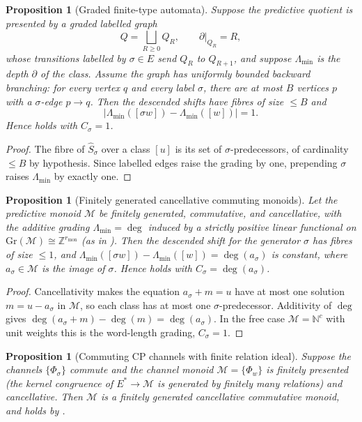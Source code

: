 \documentclass[11pt]{article}
\newtheorem{proposition}[theorem]{Proposition}
\theoremstyle{definition}
\theoremstyle{remark}
\newcommand{\N}{\mathbb{N}}
\newcommand{\Z}{\mathbb{Z}}
\newcommand{\M}{\mathcal{M}}
\newcommand{\rmon}{r_{\mathrm{mon}}}
\newcommand{\Lam}{\Lambda}
\begin{document}
\begin{proposition}[Graded finite-type automata]
\label{prop:fibres-automata}
Suppose the predictive quotient is presented by a graded labelled graph
\[
  Q=\bigsqcup_{R\ge0}Q_R,\qquad \partial|_{Q_R}=R,
\]
whose transitions labelled by $\sigma\in E$ send $Q_R$ to $Q_{R+1}$, and
suppose $\Lam_{\min}$ is the depth $\partial$ of the class.  Assume the graph has
uniformly bounded backward branching: for every vertex $q$ and every label
$\sigma$, there are at most $B$ vertices $p$ with a $\sigma$-edge $p\to q$.
Then the descended shifts have fibres of size $\le B$ and
\[
  |\Lam_{\min}([\sigma w])-\Lam_{\min}([w])|=1 .
\]
Hence  holds with $C_\sigma=1$.
\end{proposition}

\begin{proof}
The fibre of $\widehat S_\sigma$ over a class $[u]$ is its set of
$\sigma$-predecessors, of cardinality $\le B$ by hypothesis.  Since labelled
edges raise the grading by one, prepending $\sigma$ raises $\Lam_{\min}$ by
exactly one.
\end{proof}

\begin{proposition}[Finitely generated cancellative commuting monoids]
\label{prop:fibres-monoid}
Let the predictive monoid $\M$ be finitely generated, commutative, and
cancellative, with the additive grading $\Lam_{\min}=\deg$ induced by a strictly
positive linear functional on $\mathrm{Gr}(\M)\cong\Z^{\rmon}$ \textup{(}as in
\textup{)}.  Then the descended shift for the generator
$\sigma$ has fibres of size $\le1$, and
$\Lam_{\min}([\sigma w])-\Lam_{\min}([w])=\deg(a_\sigma)$ is constant, where
$a_\sigma\in\M$ is the image of $\sigma$.  Hence  holds with
$C_\sigma=\deg(a_\sigma)$.
\end{proposition}

\begin{proof}
Cancellativity makes the equation $a_\sigma+m=u$ have at most one solution
$m=u-a_\sigma$ in $\M$, so each class has at most one $\sigma$-predecessor.
Additivity of $\deg$ gives $\deg(a_\sigma+m)-\deg(m)=\deg(a_\sigma)$.  In the
free case $\M=\N^{c}$ with unit weights this is the word-length grading, $C_\sigma=1$.
\end{proof}

\begin{proposition}[Commuting CP channels with finite relation ideal]
\label{prop:fibres-cp}
Suppose the channels $\{\Phi_\sigma\}$ commute and the channel monoid
$\M=\{\Phi_w\}$ is finitely presented \textup{(}the kernel congruence of
$E^{*}\to\M$ is generated by finitely many relations\textup{)} and cancellative.
Then $\M$ is a finitely generated cancellative commutative monoid, and
 holds by .
\end{proposition}
\end{document}
